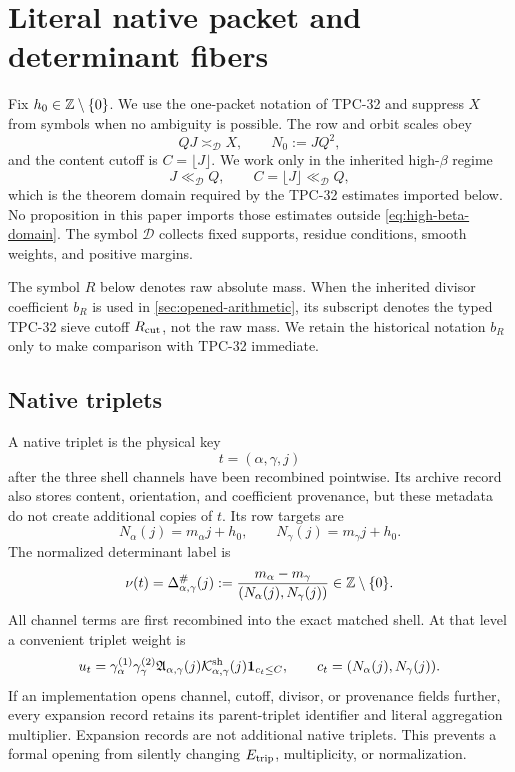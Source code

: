\section{Literal native packet and determinant fibers}
\label{sec:native-packet}

Fix \(h_0\in\mathbb Z\setminus\{0\}\).  We use the one-packet notation of
TPC-32 and suppress \(X\) from symbols when no ambiguity is possible.
The row and orbit scales obey
\begin{equation}
 QJ\asymp_{\mathscr D}X,\qquad
 N_0:=JQ^2,
\label{eq:scales}
\end{equation}
and the content cutoff is \(C=\lfloor J\rfloor\).  We work only in the
inherited high-\(\beta\) regime
\begin{equation}
 J\ll_{\mathscr D}Q,\qquad
 C=\lfloor J\rfloor\ll_{\mathscr D}Q,
\label{eq:high-beta-domain}
\end{equation}
which is the theorem domain required by the TPC-32 estimates imported
below.  No proposition in this paper imports those estimates outside
\eqref{eq:high-beta-domain}.  The symbol \(\mathscr D\) collects fixed
supports, residue conditions, smooth weights, and positive margins.

The symbol \(R\) below denotes raw absolute mass.  When the inherited
divisor coefficient \(b_R\) is used in \cref{sec:opened-arithmetic},
its subscript denotes the typed TPC-32 sieve cutoff
\(R_{\rm cut}\), not the raw mass.  We retain the historical notation
\(b_R\) only to make comparison with TPC-32 immediate.

\subsection{Native triplets}

A native triplet is the physical key
\[
 t=(\alpha,\gamma,j)
\]
after the three shell channels have been recombined pointwise.  Its
archive record also stores content, orientation, and coefficient
provenance, but these metadata do not create additional copies of
\(t\).
Its row targets are
\[
 N_\alpha(j)=m_\alpha j+h_0,\qquad
 N_\gamma(j)=m_\gamma j+h_0.
\]
The normalized determinant label is
\begin{equation}
 \nu(t)=\Delta^\#_{\alpha,\gamma}(j)
 :=\frac{m_\alpha-m_\gamma}
 {(N_\alpha(j),N_\gamma(j))}\in\mathbb Z\setminus\{0\}.
\label{eq:determinant-label}
\end{equation}
All channel terms are first recombined into the exact matched shell.
At that level a convenient triplet weight is
\begin{equation}
 u_t=
 \gamma_\alpha^{(1)}\gamma_\gamma^{(2)}
 \mathfrak A_{\alpha,\gamma}(j)
 \mathcal K_{\alpha,\gamma}^{\rm sh}(j)
 \mathbf 1_{c_t\le C},
\qquad
 c_t=(N_\alpha(j),N_\gamma(j)).
\label{eq:triplet-weight}
\end{equation}
If an implementation opens channel, cutoff, divisor, or provenance
fields further, every expansion record retains its parent-triplet
identifier and literal aggregation multiplier.  Expansion records are
not additional native triplets.  This prevents a formal opening from
silently changing \(E_{\mathrm{trip}}\), multiplicity, or normalization.

